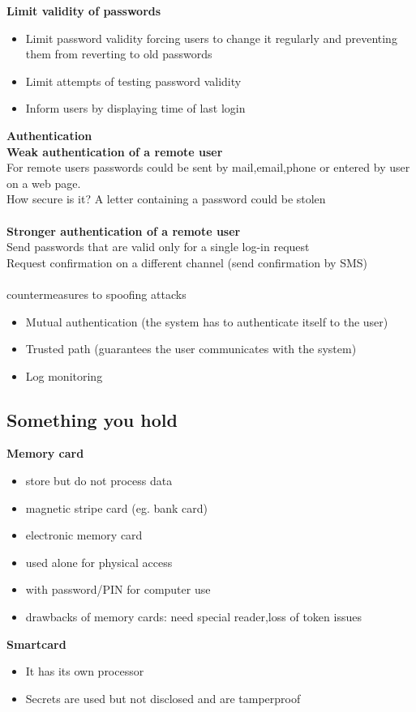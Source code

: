 \documentclass[10pt,a4paper]{book}
\begin{document}
\textbf{Limit validity of passwords}
\begin{itemize}
\item Limit password validity forcing users to change it regularly and preventing them from reverting to old passwords
\item Limit attempts of testing password validity
\item Inform users by displaying time of last login
\end{itemize}
\textbf{Authentication}\\
\textbf{Weak authentication of a remote user}\\
For remote users passwords could be sent by mail,email,phone or entered by user on a web page.\\
How secure is it? A letter containing a password could be stolen\\\\
\textbf{Stronger authentication of a remote user}\\
Send passwords that are valid only for a single log-in request\\
Request confirmation on a different channel (send confirmation by SMS)\\\\
countermeasures to spoofing attacks
\begin{itemize}
\item Mutual authentication (the system has to authenticate itself to the user)
\item Trusted path (guarantees the user communicates with the system)
\item Log monitoring
\end{itemize}
\newpage
\subsection{Something you hold}
\textbf{Memory card}
\begin{itemize}
\item store but do not process data
\item magnetic stripe card (eg. bank card)
\item electronic memory card
\item used alone for physical access
\item with password/PIN for computer use
\item drawbacks of memory cards: need special reader,loss of token issues
\end{itemize}
\textbf{Smartcard}
\begin{itemize}
\item It has its own processor
\item Secrets are used but not disclosed and are tamperproof
\end{itemize}
\end{document}
